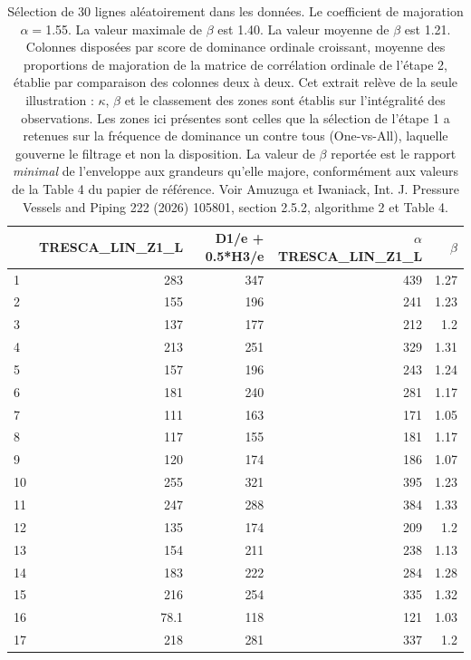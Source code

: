 \documentclass{article}
\begin{document}
    \begin{table}[htbp!]
\centering
\caption{\centering \small Sélection de 30 lignes aléatoirement dans les données. Le coefficient de majoration $\alpha=$1.55. La valeur maximale de $\beta$ est 1.40. La valeur moyenne de $\beta$ est 1.21. Colonnes disposées par score de dominance ordinale croissant, moyenne des proportions de majoration de la matrice de corrélation ordinale de l'étape 2, établie par comparaison des colonnes deux à deux. Cet extrait relève de la seule illustration : $\kappa$, $\beta$ et le classement des zones sont établis sur l'intégralité des observations. Les zones ici présentes sont celles que la sélection de l'étape 1 a retenues sur la fréquence de dominance un contre tous (One-vs-All), laquelle gouverne le filtrage et non la disposition. La valeur de $\beta$ reportée est le rapport \emph{minimal} de l'enveloppe aux grandeurs qu'elle majore, conformément aux valeurs de la Table 4 du papier de référence. Voir Amuzuga et Iwaniack, Int. J. Pressure Vessels and Piping 222 (2026) 105801, section 2.5.2, algorithme 2 et Table 4. }
\label{tab:desc_stats}
\begingroup\scriptsize
\setlength{\tabcolsep}{2pt}
\begin{tabular}{lrr|>{\columncolor{black!50!white}\color{white}}r|>{\columncolor{black!50!white}\color{white}}r}
\toprule
 & TRESCA_LIN_Z1_L & D1/e + 0.5*H3/e & $\alpha$TRESCA_LIN_Z1_L & $\beta$ \\
\midrule
1 & 283 & 347 & 439 & 1.27 \\
2 & 155 & 196 & 241 & 1.23 \\
3 & 137 & 177 & 212 & 1.2 \\
4 & 213 & 251 & 329 & 1.31 \\
5 & 157 & 196 & 243 & 1.24 \\
6 & 181 & 240 & 281 & 1.17 \\
7 & 111 & 163 & 171 & 1.05 \\
8 & 117 & 155 & 181 & 1.17 \\
9 & 120 & 174 & 186 & 1.07 \\
10 & 255 & 321 & 395 & 1.23 \\
11 & 247 & 288 & 384 & 1.33 \\
12 & 135 & 174 & 209 & 1.2 \\
13 & 154 & 211 & 238 & 1.13 \\
14 & 183 & 222 & 284 & 1.28 \\
15 & 216 & 254 & 335 & 1.32 \\
16 & 78.1 & 118 & 121 & 1.03 \\
17 & 218 & 281 & 337 & 1.2 \\

\end{tabular}
\end{table}
\end{document}
